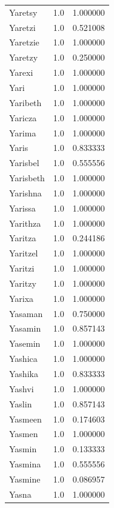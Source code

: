 \documentclass[
  letterpaper,
  DIV=11,
  numbers=noendperiod]{scrreprt}
\begin{document}
\begin{tabular}{lrr}
Yaretsy         &   1.0 &   1.000000 \\
Yaretzi         &   1.0 &   0.521008 \\
Yaretzie        &   1.0 &   1.000000 \\
Yaretzy         &   1.0 &   0.250000 \\
Yarexi          &   1.0 &   1.000000 \\
Yari            &   1.0 &   1.000000 \\
Yaribeth        &   1.0 &   1.000000 \\
Yaricza         &   1.0 &   1.000000 \\
Yarima          &   1.0 &   1.000000 \\
Yaris           &   1.0 &   0.833333 \\
Yarisbel        &   1.0 &   0.555556 \\
Yarisbeth       &   1.0 &   1.000000 \\
Yarishna        &   1.0 &   1.000000 \\
Yarissa         &   1.0 &   1.000000 \\
Yarithza        &   1.0 &   1.000000 \\
Yaritza         &   1.0 &   0.244186 \\
Yaritzel        &   1.0 &   1.000000 \\
Yaritzi         &   1.0 &   1.000000 \\
Yaritzy         &   1.0 &   1.000000 \\
Yarixa          &   1.0 &   1.000000 \\
Yasaman         &   1.0 &   0.750000 \\
Yasamin         &   1.0 &   0.857143 \\
Yasemin         &   1.0 &   1.000000 \\
Yashica         &   1.0 &   1.000000 \\
Yashika         &   1.0 &   0.833333 \\
Yashvi          &   1.0 &   1.000000 \\
Yaslin          &   1.0 &   0.857143 \\
Yasmeen         &   1.0 &   0.174603 \\
Yasmen          &   1.0 &   1.000000 \\
Yasmin          &   1.0 &   0.133333 \\
Yasmina         &   1.0 &   0.555556 \\
Yasmine         &   1.0 &   0.086957 \\
Yasna           &   1.0 &   1.000000 \\

\end{tabular}
\end{document}
